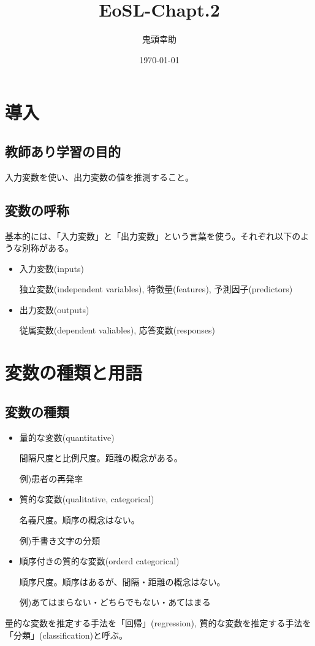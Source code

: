 \documentclass{jsarticle}
\title{EoSL-Chapt.2}
\author{鬼頭幸助}
\date{\today}
\begin{document}
\maketitle
\section{導入}
\subsection{教師あり学習の目的}

入力変数を使い、出力変数の値を推測すること。

\subsection{変数の呼称}
基本的には、「入力変数」と「出力変数」という言葉を使う。それぞれ以下のような別称がある。
\begin{itemize}
    \item 入力変数(inputs)

    独立変数(independent variables), 特徴量(features), 予測因子(predictors)

    \item 出力変数(outputs)

    従属変数(dependent valiables), 応答変数(responses)
\end{itemize}

\section{変数の種類と用語}
\subsection{変数の種類}
\begin{itemize}
  \item 量的な変数(quantitative)

  間隔尺度と比例尺度。距離の概念がある。

  例)患者の再発率

  \item 質的な変数(qualitative, categorical)

  名義尺度。順序の概念はない。

  例)手書き文字の分類

  \item 順序付きの質的な変数(orderd categorical)

  順序尺度。順序はあるが、間隔・距離の概念はない。

  例)あてはまらない・どちらでもない・あてはまる

\end{itemize}
量的な変数を推定する手法を「回帰」(regression),
質的な変数を推定する手法を「分類」(classification)と呼ぶ。
\end{document}
